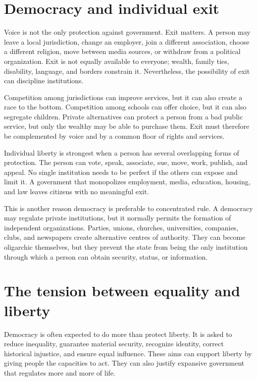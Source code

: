 ﻿\documentclass[12pt,a4paper]{book}
\begin{document}
\section{Democracy and individual exit}

Voice is not the only protection against government.  Exit matters.  A
person may leave a local jurisdiction, change an employer, join a different
association, choose a different religion, move between media sources, or
withdraw from a political organization.  Exit is not equally available to
everyone; wealth, family ties, disability, language, and borders constrain
it.  Nevertheless, the possibility of exit can discipline institutions.

Competition among jurisdictions can improve services, but it can also create
a race to the bottom.  Competition among schools can offer choice, but it
can also segregate children.  Private alternatives can protect a person
from a bad public service, but only the wealthy may be able to purchase
them.  Exit must therefore be complemented by voice and by a common floor of
rights and services.

Individual liberty is strongest when a person has several overlapping forms
of protection.  The person can vote, speak, associate, sue, move, work,
publish, and appeal.  No single institution needs to be perfect if the
others can expose and limit it.  A government that monopolizes employment,
media, education, housing, and law leaves citizens with no meaningful exit.

This is another reason democracy is preferable to concentrated rule.  A
democracy may regulate private institutions, but it normally permits the
formation of independent organizations.  Parties, unions, churches,
universities, companies, clubs, and newspapers create alternative centres of
authority.  They can become oligarchic themselves, but they prevent the
state from being the only institution through which a person can obtain
security, status, or information.

\section{The tension between equality and liberty}

Democracy is often expected to do more than protect liberty.  It is asked to
reduce inequality, guarantee material security, recognize identity, correct
historical injustice, and ensure equal influence.  These aims can support
liberty by giving people the capacities to act.  They can also justify
expansive government that regulates more and more of life.
\end{document}
